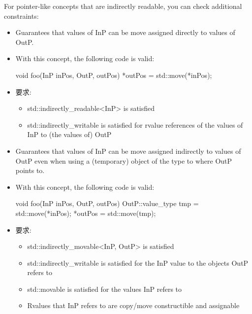 For pointer-like concepts that are indirectly readable, you can check additional constraints:


\begin{itemize}
\item
Guarantees that values of InP can be move assigned directly to values of OutP.

\item
With this concept, the following code is valid:

\begin{cpp}
void foo(InP inPos, OutP, outPos) {
	*outPos = std::move(*inPos);
}
\end{cpp}

\item
要求:
\begin{itemize}
\item
std::indirectly\_readable<InP> is satisfied

\item
std::indirectly\_writable is satisfied for rvalue references of the values of InP to (the values of) OutP
\end{itemize}
\end{itemize}


\begin{itemize}
\item
Guarantees that values of InP can be move assigned indirectly to values of OutP even when using a (temporary) object of the type to where OutP points to.

\item
With this concept, the following code is valid:

\begin{cpp}
void foo(InP inPos, OutP, outPos) {
	OutP::value_type tmp = std::move(*inPos);
	*outPos = std::move(tmp);
}
\end{cpp}

\item
要求:
\begin{itemize}
\item
std::indirectly\_movable<InP, OutP> is satisfied

\item
std::indirectly\_writable is satisfied for the InP value to the objects OutP refers to

\item
std::movable is satisfied for the values InP refers to

\item
Rvalues that InP refers to are copy/move constructible and assignable
\end{itemize}
\end{itemize}

